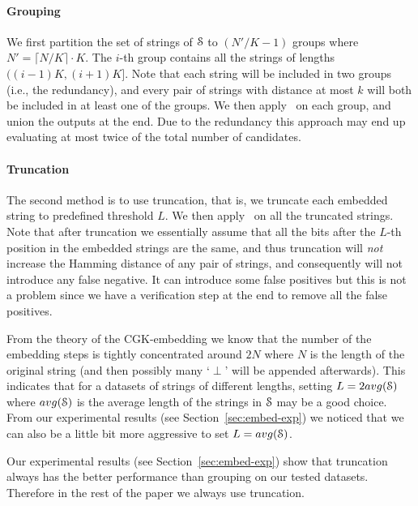 \vspace{-0.5mm} 

\paragraph{Grouping}
We first partition the set of strings of $\S$ to $(N'/K - 1)$ groups where $N' = \lceil N/K \rceil \cdot K$.  The $i$-th group contains all the strings of lengths $((i-1) K, (i+1) K]$. Note that each string will be included in two groups (i.e., the redundancy), and every pair of strings with distance at most $k$ will both be included in at least one of the groups. We then apply \ebdjoin\ on each group, and union the outputs at the end.  Due to the redundancy this approach may end up evaluating at most twice of the total number of candidates.

\vspace{-0.5mm} 

\paragraph{Truncation}
The second method is to use truncation, that is, we truncate each embedded string to predefined threshold $L$.  We then apply \ebdjoin\ on all the truncated strings.  Note that after truncation we essentially assume that all the bits after the $L$-th position in the embedded strings are the same, and thus truncation will {\em not} increase the Hamming distance of any pair of strings, and consequently will not introduce any false negative.  It can introduce some false positives but this is not a problem since we have a verification step at the end to remove all the false positives.

From the theory of the CGK-embedding we know that the number of the embedding steps is tightly concentrated around $2N$ where $N$ is the length of the original string (and then possibly many `$\perp$' will be appended afterwards). This indicates that for a datasets of strings of different lengths,  setting $L = 2 avg(\S)$ where $avg(\S)$ is the average length of the strings in $\S$ may be a good choice.  From our experimental results (see Section~\ref{sec:embed-exp}) we noticed that we can also be a little bit more aggressive to set $L = avg(\S)$.
\smallskip

Our experimental results (see Section~\ref{sec:embed-exp}) show that truncation always has the better performance than grouping on our tested datasets.  Therefore in the rest of the paper we always use truncation.



